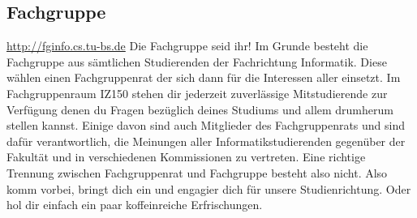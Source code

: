 \begin{multicols}{2}
\subsection{Fachgruppe}
	\label{fachgruppe}
	\url{http://fginfo.cs.tu-bs.de}
	Die Fachgruppe seid ihr! Im Grunde besteht die Fachgruppe aus sämtlichen Studierenden der Fachrichtung Informatik. Diese wählen einen Fachgruppenrat der sich dann für die Interessen aller einsetzt. 
	Im Fachgruppenraum IZ150 stehen dir jederzeit zuverlässige Mitstudierende zur Verfügung denen du Fragen bezüglich deines Studiums und allem drumherum stellen kannst. Einige davon sind auch Mitglieder des Fachgruppenrats und sind dafür verantwortlich, die Meinungen aller Informatikstudierenden gegenüber der Fakultät und in verschiedenen Kommissionen zu vertreten. Eine richtige Trennung zwischen Fachgruppenrat und Fachgruppe besteht also nicht. Also komm vorbei, bringt dich ein und engagier dich für unsere Studienrichtung. Oder hol dir einfach ein paar koffeinreiche Erfrischungen. 
\end{multicols}